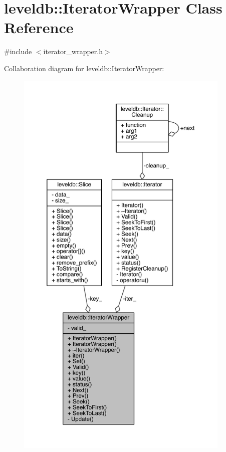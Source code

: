 \hypertarget{classleveldb_1_1_iterator_wrapper}{}\section{leveldb\+:\+:Iterator\+Wrapper Class Reference}
\label{classleveldb_1_1_iterator_wrapper}


{\ttfamily \#include $<$iterator\+\_\+wrapper.\+h$>$}



Collaboration diagram for leveldb\+:\+:Iterator\+Wrapper\+:\nopagebreak
\begin{figure}[H]
\begin{center}
\leavevmode
\includegraphics[height=550pt]{classleveldb_1_1_iterator_wrapper__coll__graph}
\end{center}
\end{figure}
